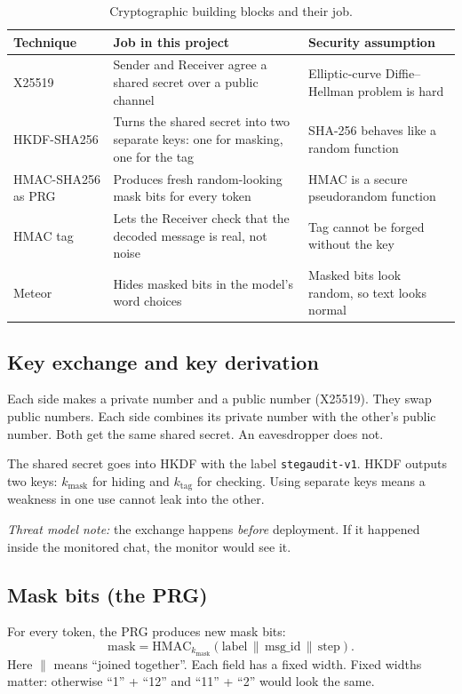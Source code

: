 \documentclass[11pt,a4paper]{article}
\begin{document}
\begin{table}[H]\centering
\caption{Cryptographic building blocks and their job.}\label{tab:crypto}
\begin{tabularx}{\linewidth}{lXX}
\toprule
\textbf{Technique} & \textbf{Job in this project} & \textbf{Security assumption}\\
\midrule
X25519 \cite{rfc7748} & Sender and Receiver agree a shared secret over a public channel & Elliptic-curve Diffie--Hellman problem is hard\\
HKDF-SHA256 \cite{rfc5869} & Turns the shared secret into two separate keys: one for masking, one for the tag & SHA-256 behaves like a random function\\
HMAC-SHA256 as PRG \cite{rfc2104} & Produces fresh random-looking mask bits for every token & HMAC is a secure pseudorandom function\\
HMAC tag & Lets the Receiver check that the decoded message is real, not noise & Tag cannot be forged without the key\\
Meteor \cite{kaptchuk2021} & Hides masked bits in the model's word choices & Masked bits look random, so text looks normal\\
\bottomrule
\end{tabularx}
\end{table}

\subsection{Key exchange and key derivation}
Each side makes a private number and a public number (X25519).
They swap public numbers. Each side combines its private number with the other's public number.
Both get the same shared secret. An eavesdropper does not.

The shared secret goes into HKDF with the label \texttt{stegaudit-v1}.
HKDF outputs two keys: $k_\text{mask}$ for hiding and $k_\text{tag}$ for checking.
Using separate keys means a weakness in one use cannot leak into the other.

\textit{Threat model note:} the exchange happens \emph{before} deployment.
If it happened inside the monitored chat, the monitor would see it.

\subsection{Mask bits (the PRG)}
For every token, the PRG produces new mask bits:
\[
\text{mask} = \mathrm{HMAC}_{k_\text{mask}}(\text{label} \,\|\, \text{msg\_id} \,\|\, \text{step}).
\]
Here $\|$ means ``joined together''. Each field has a fixed width.
Fixed widths matter: otherwise ``1'' + ``12'' and ``11'' + ``2'' would look the same.
\end{document}
